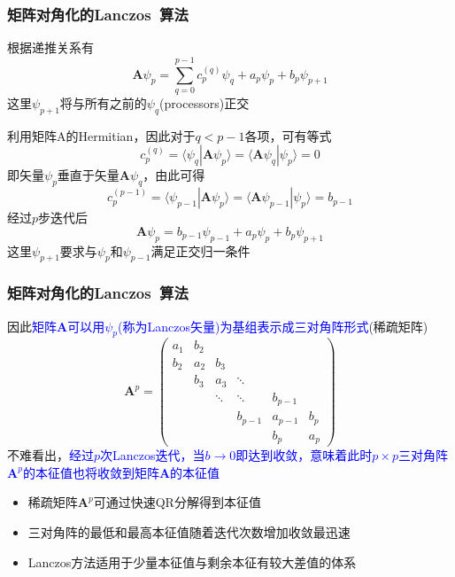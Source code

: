 \documentclass[cjk,slidestop,compress,mathserif,blue]{beamer}
\begin{document}
\frame
{
	\frametitle{矩阵对角化的\textrm{Lanczos~}算法}
	根据递推关系有
	\begin{displaymath}
		\mathbf{A}\psi_p=\sum_{q=0}^{p-1}c_p^{(q)}\psi_q+a_p\psi_p+b_p\psi_{p+1}
	\end{displaymath}
	这里$\psi_{p+1}$将与所有之前的$\psi_q$(\textrm{processors})正交

	利用矩阵$\mathrm{A}$的\textrm{Hermitian}，因此对于$q<p-1$各项，可有等式
	\begin{displaymath}
		c_p^{(q)}=\langle\psi_q|\mathbf{A}\psi_p\rangle=\langle\mathbf{A}\psi_q|\psi_p\rangle=0
	\end{displaymath}
	即矢量$\psi_p$垂直于矢量$\mathbf{A}\psi_q$，由此可得
	\begin{displaymath}
		c_p^{(p-1)}=\langle\psi_{p-1}|\mathbf{A}\psi_p\rangle=\langle\mathbf{A}\psi_{p-1}|\psi_p\rangle=b_{p-1}
	\end{displaymath}
	经过$p$步迭代后
	\begin{displaymath}
		\mathbf{A}\psi_p=b_{p-1}\psi_{p-1}+a_p\psi_p+b_p\psi_{p+1}
	\end{displaymath}
	这里$\psi_{p+1}$要求与$\psi_p$和$\psi_{p-1}$满足正交归一条件
}

\frame
{
	\frametitle{矩阵对角化的\textrm{Lanczos~}算法}
	因此\textcolor{blue}{矩阵$\mathbf{A}$可以用$\psi_p$(称为\textrm{Lanczos}矢量)为基组表示成三对角阵形式}(稀疏矩阵)
	\begin{displaymath}
		\mathbf{A}^p=\begin{pmatrix}
			a_1 & b_2 & & & & \\
			b_2 & a_2 &b_3 & & &\\
&b_3 &a_3 &\ddots & & \\
& &\ddots &\ddots &b_{p-1} & \\
& & &b_{p-1} &a_{p-1} &b_{p}\\
& & & &b_{p} &a_{p}
		\end{pmatrix}
	\end{displaymath}
	不难看出，\textcolor{blue}{经过$p$次\textrm{Lanczos}迭代，当$b\rightarrow0$即达到收敛，意味着此时$p\times p$三对角阵$\mathbf{A}^p$的本征值也将收敛到矩阵$\mathbf{A}$的本征值}
	\begin{itemize}
		\item 稀疏矩阵$\mathbf{A}^p$可通过快速\textrm{QR}分解得到本征值
		\item 三对角阵的最低和最高本征值随着迭代次数增加收敛最迅速
		\item \textrm{Lanczos}方法适用于少量本征值与剩余本征有较大差值的体系
	\end{itemize}
}
\end{document}
